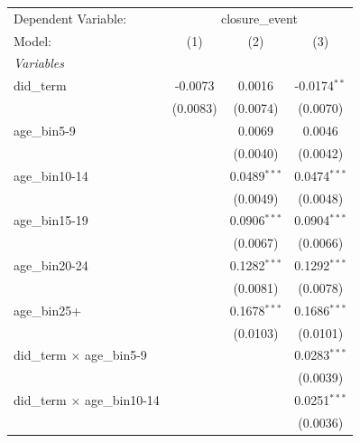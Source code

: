 
\begingroup
\centering
\begin{tabular}{lccc}
   \tabularnewline \midrule \midrule
   Dependent Variable: & \multicolumn{3}{c}{closure\_event}\\
   Model:                              & (1)                   & (2)            & (3)\\  
   \midrule
   \emph{Variables}\\
   did\_term                           & -0.0073               & 0.0016         & -0.0174$^{**}$\\   
                                       & (0.0083)              & (0.0074)       & (0.0070)\\   
   age\_bin5-9                         &                       & 0.0069         & 0.0046\\   
                                       &                       & (0.0040)       & (0.0042)\\   
   age\_bin10-14                       &                       & 0.0489$^{***}$ & 0.0474$^{***}$\\   
                                       &                       & (0.0049)       & (0.0048)\\   
   age\_bin15-19                       &                       & 0.0906$^{***}$ & 0.0904$^{***}$\\   
                                       &                       & (0.0067)       & (0.0066)\\   
   age\_bin20-24                       &                       & 0.1282$^{***}$ & 0.1292$^{***}$\\   
                                       &                       & (0.0081)       & (0.0078)\\   
   age\_bin25+                         &                       & 0.1678$^{***}$ & 0.1686$^{***}$\\   
                                       &                       & (0.0103)       & (0.0101)\\   
   did\_term $\times$ age\_bin5-9      &                       &                & 0.0283$^{***}$\\   
                                       &                       &                & (0.0039)\\   
   did\_term $\times$ age\_bin10-14    &                       &                & 0.0251$^{***}$\\   
                                       &                       &                & (0.0036)\\   

\end{tabular}

